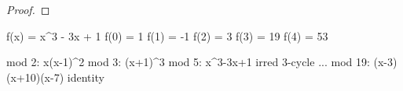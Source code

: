 \begin{proof}
	
\end{proof}

f(x) = x^3 - 3x + 1
f(0) = 1
f(1) = -1
f(2) = 3
f(3) = 19
f(4) = 53

mod 2: x(x-1)^2
mod 3: (x+1)^3
mod 5: x^3-3x+1 irred			3-cycle
...
mod 19: (x-3)(x+10)(x-7)		identity
